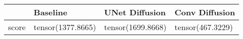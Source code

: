 \begin{tabular}{llll}
\toprule
{} &           Baseline &    UNet Diffusion  &    Conv Diffusion \\
\midrule
score &  tensor(1377.8665) &  tensor(1699.8668) &  tensor(467.3229) \\
\bottomrule
\end{tabular}
